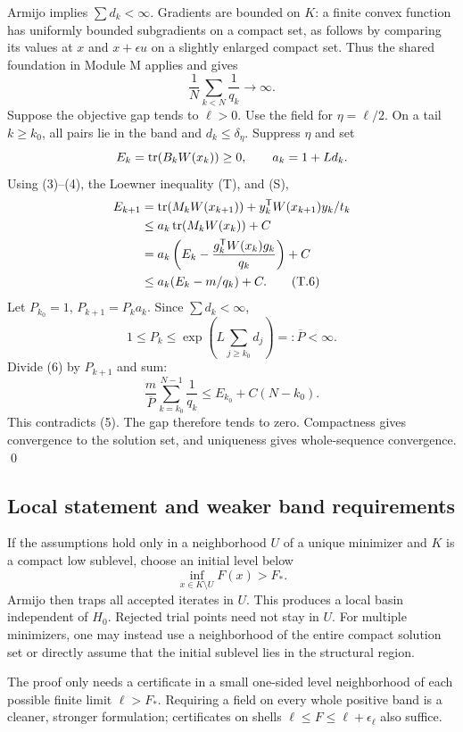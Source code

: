 \documentclass[10pt,oneside,openany]{book}
\theoremstyle{remark}\newtheorem{remark}{Remark}[chapter]
\begin{document}
Armijo implies $\sum d_k<\infty$. Gradients are bounded on $K$: a finite convex function has uniformly bounded subgradients on a compact set, as follows by comparing its values at $x$ and $x+\epsilon u$ on a slightly enlarged compact set. Thus the shared foundation in Module M applies and gives
\begin{equation}
 \frac1N\sum_{k<N}\frac1{q_k}\longrightarrow\infty. \tag{T.5}
\end{equation}
Suppose the objective gap tends to $\ell>0$. Use the field for $\eta=\ell/2$. On a tail $k\ge k_0$, all pairs lie in the band and $d_k\le\delta_\eta$. Suppress $\eta$ and set
\[
 E_k=\operatorname{tr}(B_kW(x_k))\ge0,\qquad a_k=1+L d_k.
\]
Using (3)--(4), the Loewner inequality (T), and (S),
\begin{align}
 E_{k+1}
 &=\operatorname{tr}(M_kW(x_{k+1}))+y_k^{\mathsf T} W(x_{k+1})y_k/t_k\notag\\
 &\le a_k\operatorname{tr}(M_kW(x_k))+C\notag\\
 &=a_k\left(E_k-\frac{g_k^{\mathsf T} W(x_k)g_k}{q_k}\right)+C\notag\\
 &\le a_k(E_k-m/q_k)+C. \tag{T.6}
\end{align}
Let $P_{k_0}=1$, $P_{k+1}=P_ka_k$. Since $\sum d_k<\infty$,
\[
 1\le P_k\le \exp\left(L\sum_{j\ge k_0}d_j\right)=:\overline P<\infty.
\]
Divide (6) by $P_{k+1}$ and sum:
\[
 \frac m{\overline P}\sum_{k=k_0}^{N-1}\frac1{q_k}
 \le E_{k_0}+C(N-k_0).
\]
This contradicts (5). The gap therefore tends to zero. Compactness gives convergence to the solution set, and uniqueness gives whole-sequence convergence. \qed

\subsection{Local statement and weaker band requirements}
If the assumptions hold only in a neighborhood $U$ of a unique minimizer and $K$ is a compact low sublevel, choose an initial level below
\[
 \inf_{x\in K\setminus U}F(x)>F_*.
\]
Armijo then traps all accepted iterates in $U$. This produces a local basin independent of $H_0$. Rejected trial points need not stay in $U$. For multiple minimizers, one may instead use a neighborhood of the entire compact solution set or directly assume that the initial sublevel lies in the structural region.

The proof only needs a certificate in a small one-sided level neighborhood of each possible finite limit $\ell>F_*$. Requiring a field on every whole positive band is a cleaner, stronger formulation; certificates on shells $\ell\le F\le\ell+\epsilon_\ell$ also suffice.
\end{document}
